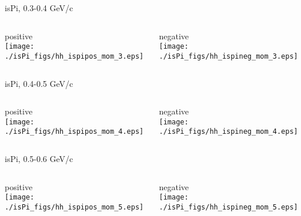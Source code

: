 \documentclass[compress]{beamer} %
\begin{document}
\begin{frame}{isPi, 0.3-0.4 GeV/c}
\begin{columns}
\begin{column}{.5\linewidth}
positive \\
\texttt{[image: ./isPi\_figs/hh\_ispipos\_mom\_3.eps]} \\
\end{column}
\begin{column}{.5\linewidth}
negative \\
\texttt{[image: ./isPi\_figs/hh\_ispineg\_mom\_3.eps]} \\
\end{column}
\end{columns}
\end{frame}


\begin{frame}{isPi, 0.4-0.5 GeV/c}
\begin{columns}
\begin{column}{.5\linewidth}
positive \\
\texttt{[image: ./isPi\_figs/hh\_ispipos\_mom\_4.eps]} \\
\end{column}
\begin{column}{.5\linewidth}
negative \\
\texttt{[image: ./isPi\_figs/hh\_ispineg\_mom\_4.eps]} \\
\end{column}
\end{columns}
\end{frame}


\begin{frame}{isPi, 0.5-0.6 GeV/c}
\begin{columns}
\begin{column}{.5\linewidth}
positive \\
\texttt{[image: ./isPi\_figs/hh\_ispipos\_mom\_5.eps]} \\
\end{column}
\begin{column}{.5\linewidth}
negative \\
\texttt{[image: ./isPi\_figs/hh\_ispineg\_mom\_5.eps]} \\
\end{column}
\end{columns}
\end{frame}
\end{document}
